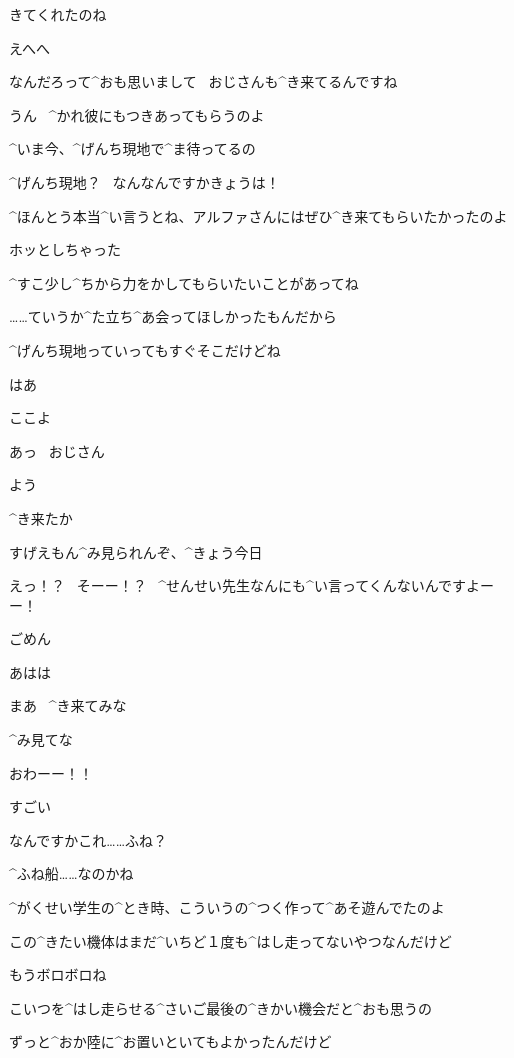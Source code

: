 \page[71]
\Sensei きてくれたのね

\Alpha えへへ

\Alpha なんだろって^{おも}{思}いまして
\ おじさんも^{き}{来}てるんですね

\Sensei うん
\ ^{かれ}{彼}にもつきあってもらうのよ

\Sensei ^{いま}{今}、^{げんち}{現地}で^{ま}{待}ってるの

\Alpha ^{げんち}{現地}？
\ なんなんですかきょうは！

\page[72]
\Sensei ^{ほんとう}{本当}^{い}{言}うとね、アルファさんにはぜひ^{き}{来}てもらいたかったのよ

\Sensei ホッとしちゃった

\Sensei ^{すこ}{少}し^{ちから}{力}をかしてもらいたいことがあってね

\Sensei ……ていうか^{た}{立}ち^{あ}{会}ってほしかったもんだから

\page[73]
\Sensei ^{げんち}{現地}っていってもすぐそこだけどね

\Alpha はあ

\Sensei ここよ

\page[74]
\Alpha あっ
\ おじさん

\Ojisan よう

\page[75]
\Ojisan ^{き}{来}たか

\Ojisan すげえもん^{み}{見}られんぞ、^{きょう}{今日}

\Alpha えっ！？
\ そーー！？
\ ^{せんせい}{先生}なんにも^{い}{言}ってくんないんですよーー！

\Sensei ごめん

\Alpha あはは

\Ojisan まあ
\ ^{き}{来}てみな

\Ojisan ^{み}{見}てな

\page[76]
\Alpha おわーー！！

\page[77]
\Alpha すごい

\Alpha なんですかこれ……ふね？

\Sensei ^{ふね}{船}……なのかね

\Sensei ^{がくせい}{学生}の^{とき}{時}、こういうの^{つく}{作}って^{あそ}{遊}んでたのよ

\Sensei この^{きたい}{機体}はまだ^{いちど}{１度}も^{はし}{走}ってないやつなんだけど

\Sensei もうボロボロね

\Sensei こいつを^{はし}{走}らせる^{さいご}{最後}の^{きかい}{機会}だと^{おも}{思}うの

\page[78]
\Sensei ずっと^{おか}{陸}に^{お}{置}いといてもよかったんだけど

